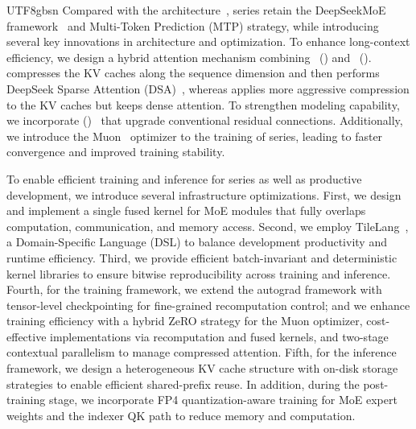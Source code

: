 \begin{CJK*}{UTF8}{gbsn}
Compared with the \dsviii{} architecture~\citep{dsv3}, \dsviv{} series retain the DeepSeekMoE framework~\citep{deepseekmoe} and Multi-Token Prediction (MTP) strategy, while introducing several key innovations in architecture and optimization.  
To enhance long-context efficiency, we design a hybrid attention mechanism combining \csafull{}~(\csa{}) and \hcafull{}~(\hca{}). 
\csa{} compresses the KV caches along the sequence dimension and then performs DeepSeek Sparse Attention (DSA)~\citep{dsv32}, whereas \hca{} applies more aggressive compression to the KV caches but keeps dense attention.
To strengthen modeling capability, we incorporate \mhcfull{} (\mhc{})~\citep{mhc} that upgrade conventional residual connections.  
Additionally, we introduce the Muon~\citep{muon,muon_kimi} optimizer to the training of \dsviv{} series, leading to faster convergence and improved training stability.

To enable efficient training and inference for \dsviv{} series as well as productive development, we introduce several infrastructure optimizations.
First, we design and implement a single fused kernel for MoE modules that fully overlaps computation, communication, and memory access. 
Second, we employ TileLang~\citep{wangtilelang}, a Domain-Specific Language (DSL) to balance development productivity and runtime efficiency. 
Third, we provide efficient batch-invariant and deterministic kernel libraries to ensure bitwise reproducibility across training and inference. 
Fourth, for the training framework, we extend the autograd framework with tensor-level checkpointing for fine-grained recomputation control; and we enhance training efficiency with a hybrid ZeRO strategy for the Muon optimizer, cost-effective \mhc{} implementations via recomputation and fused kernels, and two-stage contextual parallelism to manage compressed attention.
Fifth, for the inference framework, we design a heterogeneous KV cache structure with on-disk storage strategies to enable efficient shared-prefix reuse.
In addition, during the post-training stage, we incorporate FP4 quantization-aware training for MoE expert weights and the indexer QK path to reduce memory and computation. 


\end{CJK*}
